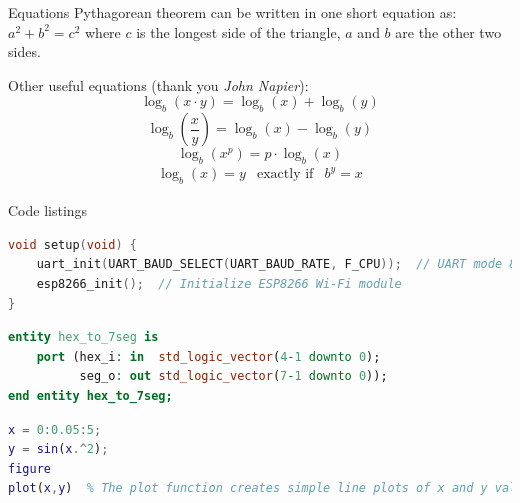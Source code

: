 \documentclass[aspectratio=1610]{beamer}
\begin{document}
\begin{frame}{Equations}
    Pythagorean theorem can be written in one short equation as: $a^2 + b^2 = c^2$ where $c$ is the longest side of the triangle, $a$ and $b$ are the other two sides.

    \vfill %

    Other useful equations (thank you \textit{John Napier}):
    \begin{equation}
        \log_b (x\cdot y) = \log_b (x) + \log_b (y)
    \end{equation}
    \begin{equation}
        \log_b \left( \frac{x}{y} \right) = \log_b (x) - \log_b (y)
    \end{equation}
    \begin{equation}
        \log_b (x^p) = p\cdot \log_b (x)
    \end{equation}
    \begin{eqnarray*}
        \log_b(x) = y & \text{exactly if} & b^y = x
    \end{eqnarray*}
\end{frame}

\begin{frame}[fragile]{Code listings}

\begin{lstlisting}[language=C,title={This is title}]
void setup(void) {
    uart_init(UART_BAUD_SELECT(UART_BAUD_RATE, F_CPU));  // UART mode 8N1
    esp8266_init();  // Initialize ESP8266 Wi-Fi module
}
\end{lstlisting}

\begin{lstlisting}[language=vhdl,title={This is title}]
entity hex_to_7seg is
    port (hex_i: in  std_logic_vector(4-1 downto 0);
          seg_o: out std_logic_vector(7-1 downto 0));
end entity hex_to_7seg;
\end{lstlisting}

\begin{lstlisting}[language=Matlab,caption={This is caption}]
x = 0:0.05:5;
y = sin(x.^2);
figure
plot(x,y)  % The plot function creates simple line plots of x and y values
\end{lstlisting}
\end{frame}
\end{document}
